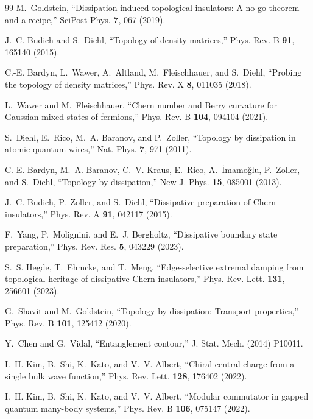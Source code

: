 \documentclass[aps,prl,onecolumn,superscriptaddress,nofootinbib]{revtex4-2}
\begin{document}
\begin{thebibliography}{99}
M.~Goldstein,
``Dissipation-induced topological insulators: A no-go theorem and a recipe,''
SciPost Phys. \textbf{7}, 067 (2019).

J.~C. Budich and S.~Diehl,
``Topology of density matrices,''
Phys. Rev. B \textbf{91}, 165140 (2015).

C.-E. Bardyn, L.~Wawer, A.~Altland, M.~Fleischhauer, and S.~Diehl,
``Probing the topology of density matrices,''
Phys. Rev. X \textbf{8}, 011035 (2018).

L.~Wawer and M.~Fleischhauer,
``Chern number and Berry curvature for Gaussian mixed states of fermions,''
Phys. Rev. B \textbf{104}, 094104 (2021).

S.~Diehl, E.~Rico, M.~A. Baranov, and P.~Zoller,
``Topology by dissipation in atomic quantum wires,''
Nat. Phys. \textbf{7}, 971 (2011).

C.-E. Bardyn, M.~A. Baranov, C.~V. Kraus, E.~Rico, A.~\.{I}mamo\u{g}lu, P.~Zoller, and S.~Diehl,
``Topology by dissipation,''
New J. Phys. \textbf{15}, 085001 (2013).

J.~C. Budich, P.~Zoller, and S.~Diehl,
``Dissipative preparation of Chern insulators,''
Phys. Rev. A \textbf{91}, 042117 (2015).

F.~Yang, P.~Molignini, and E.~J. Bergholtz,
``Dissipative boundary state preparation,''
Phys. Rev. Res. \textbf{5}, 043229 (2023).

S.~S. Hegde, T.~Ehmcke, and T.~Meng,
``Edge-selective extremal damping from topological heritage of dissipative Chern insulators,''
Phys. Rev. Lett. \textbf{131}, 256601 (2023).

G.~Shavit and M.~Goldstein,
``Topology by dissipation: Transport properties,''
Phys. Rev. B \textbf{101}, 125412 (2020).

Y.~Chen and G.~Vidal,
``Entanglement contour,''
J. Stat. Mech. (2014) P10011.

I.~H. Kim, B.~Shi, K.~Kato, and V.~V. Albert,
``Chiral central charge from a single bulk wave function,''
Phys. Rev. Lett. \textbf{128}, 176402 (2022).

I.~H. Kim, B.~Shi, K.~Kato, and V.~V. Albert,
``Modular commutator in gapped quantum many-body systems,''
Phys. Rev. B \textbf{106}, 075147 (2022).


\end{thebibliography}
\end{document}
